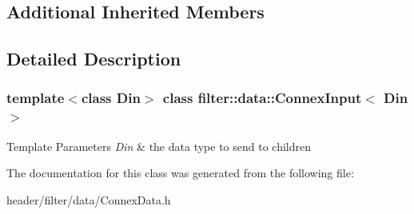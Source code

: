 \subsection*{Additional Inherited Members}


\subsection{Detailed Description}
\subsubsection*{template$<$class Din$>$\newline
class filter\+::data\+::\+Connex\+Input$<$ Din $>$}


\begin{DoxyTemplParams}{Template Parameters}
{\em Din} & the data type to send to children \\
\hline
\end{DoxyTemplParams}


The documentation for this class was generated from the following file\+:\begin{DoxyCompactItemize}
\item 
header/filter/data/Connex\+Data.\+h\end{DoxyCompactItemize}
